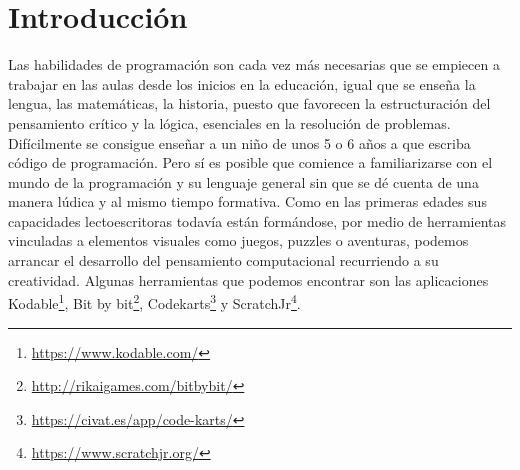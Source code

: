 \documentclass[a4paper, 12pt]{book}
\begin{document}


\tableofcontents 
\cleardoublepage
\listoffigures %



\cleardoublepage
\chapter{Introducción}
\label{chap:intro} %

Las habilidades de programación son cada vez  más necesarias que se empiecen a trabajar en las aulas desde los inicios en la educación, igual que se enseña la lengua, las matemáticas, la historia, puesto que favorecen la estructuración del pensamiento crítico y la lógica, esenciales en la resolución de problemas.
Difícilmente se consigue enseñar a un niño de unos 5 o 6 años a que escriba código de programación.
Pero sí es posible que comience a familiarizarse con el mundo de la programación y su lenguaje general sin que se dé cuenta de una manera lúdica y al mismo tiempo formativa.
Como en las primeras edades sus capacidades lectoescritoras todavía están formándose, por medio de herramientas vinculadas a elementos visuales como juegos, puzzles o aventuras, podemos arrancar el desarrollo del pensamiento computacional recurriendo a su creatividad. Algunas herramientas que podemos encontrar son las aplicaciones Kodable\footnote{\url{https://www.kodable.com/}}, Bit by bit\footnote{\url{http://rikaigames.com/bitbybit/}}, Codekarts\footnote{\url{https://civat.es/app/code-karts/}}  y ScratchJr\footnote{\url{https://www.scratchjr.org/}}. 
\end{document}
